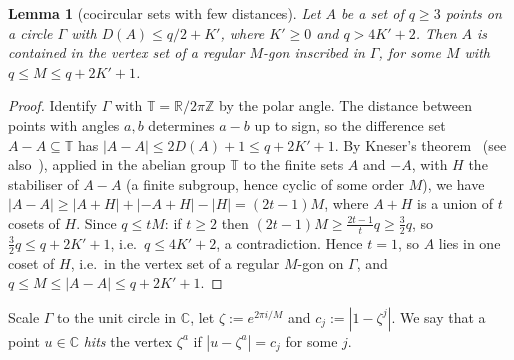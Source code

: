 \documentclass[11pt]{amsart}
\newtheorem{lemma}[theorem]{Lemma}
\theoremstyle{definition}
\theoremstyle{remark}
\newcommand{\R}{\mathbb{R}}
\begin{document}
\begin{lemma}[cocircular sets with few distances]\label{lem:kneser}
Let $A$ be a set of $q\ge3$ points on a circle $\Gamma$ with $D(A)\le q/2+K'$, where $K'\ge0$ and $q>4K'+2$. Then $A$ is contained in the vertex set of a regular $M$-gon inscribed in $\Gamma$, for some $M$ with $q\le M\le q+2K'+1$.
\end{lemma}
\begin{proof}
Identify $\Gamma$ with $\mathbb T=\R/2\pi\mathbb Z$ by the polar angle. The distance between points with angles $a,b$ determines $a-b$ up to sign, so the difference set $A-A\subseteq\mathbb T$ has $|A-A|\le2D(A)+1\le q+2K'+1$. By Kneser's theorem~\cite{Kn53} (see also~\cite{TV06}), applied in the abelian group $\mathbb T$ to the finite sets $A$ and $-A$, with $H$ the stabiliser of $A-A$ (a finite subgroup, hence cyclic of some order $M$), we have $|A-A|\ge|A+H|+|{-A}+H|-|H|=(2t-1)M$, where $A+H$ is a union of $t$ cosets of $H$. Since $q\le tM$: if $t\ge2$ then $(2t-1)M\ge\frac{2t-1}{t}q\ge\frac32q$, so $\frac32q\le q+2K'+1$, i.e.\ $q\le4K'+2$, a contradiction. Hence $t=1$, so $A$ lies in one coset of $H$, i.e.\ in the vertex set of a regular $M$-gon on $\Gamma$, and $q\le M\le|A-A|\le q+2K'+1$.
\end{proof}

Scale $\Gamma$ to the unit circle in $\mathbb C$, let $\zeta:=e^{2\pi i/M}$ and $c_j:=|1-\zeta^j|$. We say that a point $u\in\mathbb C$ \emph{hits} the vertex $\zeta^a$ if $|u-\zeta^a|=c_j$ for some $j$.
\end{document}
